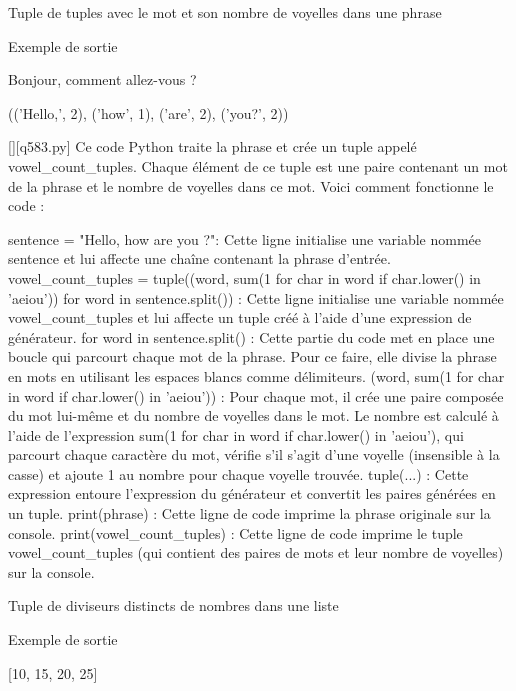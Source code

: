         \question
        Tuple de tuples avec le mot et son nombre de voyelles dans une phrase

Exemple de sortie

Bonjour, comment allez-vous ?

(('Hello,', 2), ('how', 1), ('are', 2), ('you?', 2))
        \par
        \begin{solution}
            \renewcommand{\nomfichier}{q583.py}
            \pythonfile{\chemincode \nomfichier}[][\nomfichier]
            Ce code Python traite la phrase et crée un tuple appelé vowel_count_tuples. Chaque élément de ce tuple est une paire contenant un mot de la phrase et le nombre de voyelles dans ce mot. Voici comment fonctionne le code :

    sentence = "Hello, how are you ?": Cette ligne initialise une variable nommée sentence et lui affecte une chaîne contenant la phrase d'entrée.
    vowel_count_tuples = tuple((word, sum(1 for char in word if char.lower() in 'aeiou')) for word in sentence.split()) : Cette ligne initialise une variable nommée vowel_count_tuples et lui affecte un tuple créé à l'aide d'une expression de générateur.
        for word in sentence.split() : Cette partie du code met en place une boucle qui parcourt chaque mot de la phrase. Pour ce faire, elle divise la phrase en mots en utilisant les espaces blancs comme délimiteurs.
        (word, sum(1 for char in word if char.lower() in 'aeiou')) : Pour chaque mot, il crée une paire composée du mot lui-même et du nombre de voyelles dans le mot. Le nombre est calculé à l'aide de l'expression sum(1 for char in word if char.lower() in 'aeiou'), qui parcourt chaque caractère du mot, vérifie s'il s'agit d'une voyelle (insensible à la casse) et ajoute 1 au nombre pour chaque voyelle trouvée.
        tuple(...) : Cette expression entoure l'expression du générateur et convertit les paires générées en un tuple.
    print(phrase) : Cette ligne de code imprime la phrase originale sur la console.
    print(vowel_count_tuples) : Cette ligne de code imprime le tuple vowel_count_tuples (qui contient des paires de mots et leur nombre de voyelles) sur la console.
        \end{solution}
        

        \question
        Tuple de diviseurs distincts de nombres dans une liste

Exemple de sortie

[10, 15, 20, 25]

